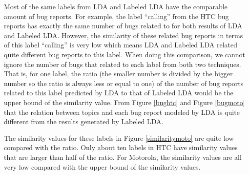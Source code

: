 \documentclass[10pt, conference, compsocconf]{IEEEtran}
\begin{document}
Most of the same labels from LDA and Labeled LDA have the comparable amount of bug reports. For example, the label ``calling'' from the HTC bug reports has exactly the same number of bugs related to for both results of LDA and Labeled LDA. However, the similarity of these related bug reports in terms of this label ``calling'' is very low which means LDA and Labeled LDA related quite different bug reports to this label. When doing this comparison, we cannot ignore the number of bugs that related to each label from both two techniques. That is, for one label, the ratio (the smaller number is divided by the bigger number so the ratio is always less or equal to one) of the number of bug reports related to this label predicted by LDA to that of Labeled LDA would be the upper bound of the similarity value. From Figure \ref{bughtc} and Figure \ref{bugmoto} that the relation between topics and each bug report modeled by LDA is quite different from the results generated by Labeled LDA.

The similarity values for these labels in Figure \ref{similaritymoto} are quite low compared with the ratio. Only about ten labels in HTC have similarity values that are larger than half of the ratio. For Motorola, the similarity values are all very low compared with the upper bound of the similarity values.
\end{document}
